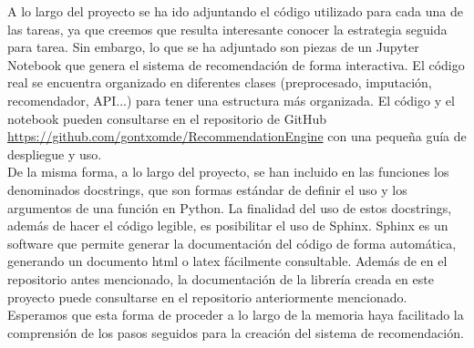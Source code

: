 A lo largo del proyecto se ha ido adjuntando el código utilizado para cada una de las tareas, ya que creemos que resulta interesante conocer la estrategia seguida para tarea. Sin embargo, lo que se ha adjuntado son piezas de un Jupyter Notebook que genera el sistema de recomendación de forma interactiva. El código real se encuentra organizado en diferentes clases (preprocesado, imputación, recomendador, API...) para tener una estructura más organizada. El código y el notebook pueden consultarse en el repositorio de GitHub \url{https://github.com/gontxomde/RecommendationEngine} con una pequeña guía de despliegue y uso.\\

De la misma forma, a lo largo del proyecto, se han incluido en las funciones los denominados docstrings, que son formas estándar de definir el uso y los argumentos de una función en Python. La finalidad del uso de estos docstrings, además de hacer el código legible, es posibilitar el uso de Sphinx. Sphinx es un software que permite generar la documentación del código de forma automática, generando un documento html o latex fácilmente consultable. Además de en el repositorio antes mencionado, la documentación de la librería creada en este proyecto puede consultarse en el repositorio anteriormente mencionado.\\

Esperamos que esta forma de proceder a lo largo de la memoria haya facilitado la comprensión de los pasos seguidos para la creación del sistema de recomendación.


